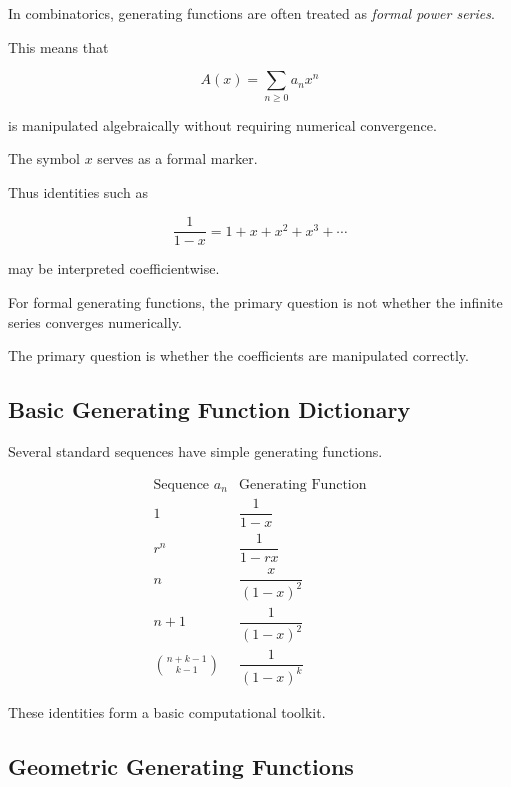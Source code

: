 In combinatorics, generating functions are often treated as
\emph{formal power series}.

This means that

\[
A(x)
=
\sum_{n\geq0}a_nx^n
\]

is manipulated algebraically without requiring numerical convergence.

The symbol \(x\) serves as a formal marker.

Thus identities such as

\[
\frac{1}{1-x}
=
1+x+x^2+x^3+\cdots
\]

may be interpreted coefficientwise.

\begin{importantbox}
For formal generating functions, the primary question is not whether
the infinite series converges numerically.

The primary question is whether the coefficients are manipulated
correctly.
\end{importantbox}

\subsection{Basic Generating Function Dictionary}
\label{subsec:gf-dictionary}

Several standard sequences have simple generating functions.

\[
\boxed{
\begin{array}{c|c}
\text{Sequence }a_n & \text{Generating Function}\\
\hline
1 & \dfrac{1}{1-x}\\[3mm]
r^n & \dfrac{1}{1-rx}\\[3mm]
n & \dfrac{x}{(1-x)^2}\\[3mm]
n+1 & \dfrac{1}{(1-x)^2}\\[3mm]
\binom{n+k-1}{k-1}
&
\dfrac{1}{(1-x)^k}
\end{array}
}
\]

These identities form a basic computational toolkit.

\subsection{Geometric Generating Functions}
\label{subsec:geometric-generating-functions}

